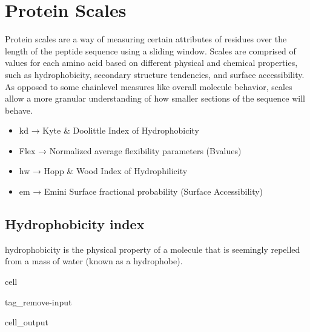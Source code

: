 \documentclass[letterpaper,10pt,english]{jupyterBook}
\begin{document}
\section{Protein Scales}
\label{\detokenize{ipynb/chapter1:protein-scales}}
\sphinxAtStartPar
Protein scales are a way of measuring certain attributes of residues over the length of the peptide sequence using a sliding window. Scales are comprised of values for each amino acid based on different physical and chemical properties, such as hydrophobicity, secondary structure tendencies, and surface accessibility. As opposed to some chain\sphinxhyphen{}level measures like overall molecule behavior, scales allow a more granular understanding of how smaller sections of the sequence will behave.
\begin{itemize}
\item {} 
\sphinxAtStartPar
kd → Kyte \& Doolittle Index of Hydrophobicity

\item {} 
\sphinxAtStartPar
Flex → Normalized average flexibility parameters (B\sphinxhyphen{}values)

\item {} 
\sphinxAtStartPar
hw → Hopp \& Wood Index of Hydrophilicity

\item {} 
\sphinxAtStartPar
em → Emini Surface fractional probability (Surface Accessibility)

\end{itemize}


\subsection{Hydrophobicity index}
\label{\detokenize{ipynb/chapter1:hydrophobicity-index}}
\sphinxAtStartPar
hydrophobicity is the physical property of a molecule that is seemingly repelled from a mass of water (known as a hydrophobe).

\begin{sphinxuseclass}{cell}
\begin{sphinxuseclass}{tag_remove-input}\begin{sphinxVerbatimOutput}

\begin{sphinxuseclass}{cell_output}
\noindent{}

\end{sphinxuseclass}\end{sphinxVerbatimOutput}

\end{sphinxuseclass}
\end{sphinxuseclass}
\end{document}
